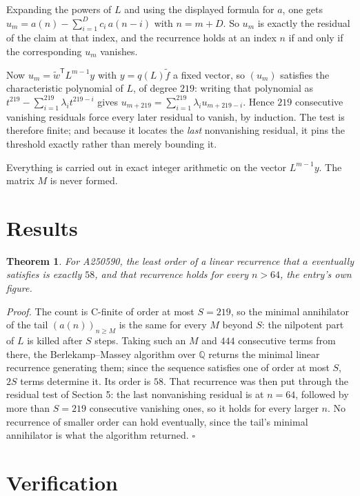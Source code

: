 \documentclass[11pt]{article}
\newtheorem{theorem}{Theorem}
\theoremstyle{definition}
\begin{document}
Expanding the powers of $L$ and using the displayed formula for $a$, one gets $u_m = a(n) - \sum_{i=1}^{D} c_i\,a(n-i)$ with $n = m + D$. So $u_m$ is exactly the residual of the claim at that index, and the recurrence holds at an index $n$ if and only if the corresponding $u_m$ vanishes.

Now $u_m = \tilde w^{\mathsf T} L^{m-1} y$ with $y = q(L)\tilde f$ a fixed vector, so $(u_m)$ satisfies the characteristic polynomial of $L$, of degree $219$: writing that polynomial as $t^{219} - \sum_{i=1}^{219} \lambda_i t^{219-i}$ gives $u_{m+219} = \sum_{i=1}^{219} \lambda_i u_{m+219-i}$. Hence $219$ consecutive vanishing residuals force every later residual to vanish, by induction. The test is therefore finite; and because it locates the {\itshape last} nonvanishing residual, it pins the threshold exactly rather than merely bounding it.

Everything is carried out in exact integer arithmetic on the vector $L^{m-1}y$. The matrix $M$ is never formed.

\section{Results}

\begin{theorem} For A250590, the least order of a linear recurrence that $a$ eventually satisfies is exactly $58$, and that recurrence holds for every $n > 64$, the entry's own figure.\end{theorem}

{\itshape Proof.} The count is C-finite of order at most $S = 219$, so the minimal annihilator of the tail $(a(n))_{n \ge M}$ is the same for every $M$ beyond $S$: the nilpotent part of $L$ is killed after $S$ steps. Taking such an $M$ and $444$ consecutive terms from there, the Berlekamp--Massey algorithm over $\mathbb{Q}$ returns the minimal linear recurrence generating them; since the sequence satisfies one of order at most $S$, $2S$ terms determine it. Its order is $58$. That recurrence was then put through the residual test of Section 5: the last nonvanishing residual is at $n = 64$, followed by more than $S = 219$ consecutive vanishing ones, so it holds for every larger $n$. No recurrence of smaller order can hold eventually, since the tail's minimal annihilator is what the algorithm returned. $\square$

\section{Verification}
\end{document}
